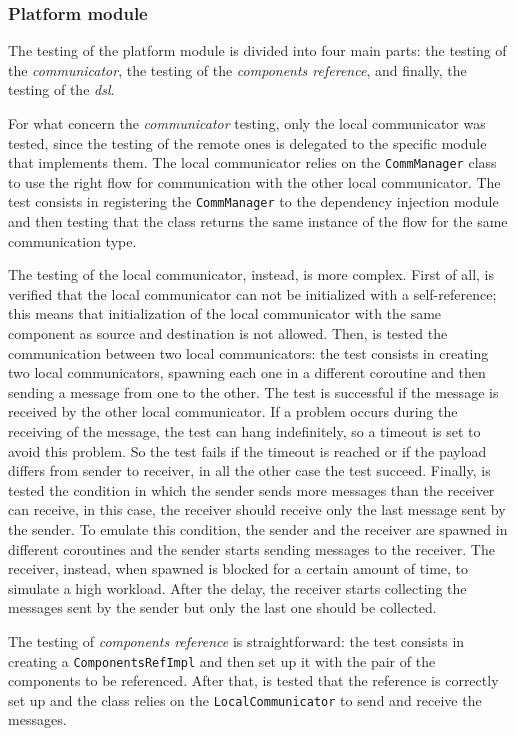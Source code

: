 \subsubsection{Platform module}

The testing of the platform module is divided into four main parts: the testing of the \emph{communicator}, the testing of the
\emph{components reference}, and finally, the testing of the \emph{dsl}.

For what concern the \emph{communicator} testing, only the local communicator was tested, since the testing of the remote ones is delegated to the
specific module that implements them. The local communicator relies on the \texttt{CommManager} class to use the right flow for communication
with the other local communicator.
The test consists in registering the \texttt{CommManager} to the dependency injection module and then testing that the class returns
the same instance of the flow for the same communication type.

The testing of the local communicator, instead, is more complex.
First of all, is verified that the local communicator can not be initialized with a self-reference; this means that initialization of the local
communicator with the same component as source and destination is not allowed.
Then, is tested the communication between two local communicators: the test consists in creating two local communicators, spawning each one in a
different coroutine and then sending a message from one to the other. The test is successful if the message is received by the other local
communicator. If a problem occurs during the receiving of the message, the test can hang indefinitely, so a timeout is set to avoid this problem.
So the test fails if the timeout is reached or if the payload differs from sender to receiver, in all the other case the test succeed.
Finally, is tested the condition in which the sender sends more messages than the receiver can receive, in this case, the receiver should receive
only the last message sent by the sender. To emulate this condition, the sender and the receiver are spawned in different coroutines and the sender
starts sending messages to the receiver. The receiver, instead, when spawned is blocked for a certain amount of time, to simulate a high workload.
After the delay, the receiver starts collecting the messages sent by the sender but only the last one should be collected.

The testing of \emph{components reference} is straightforward: the test consists in creating a \texttt{ComponentsRefImpl} and then set up
it with the pair of the components to be referenced. After that, is tested that the reference is correctly set up and the class
relies on the \texttt{LocalCommunicator} to send and receive the messages.

